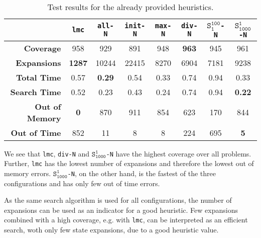 \begin{table}[h!]
    \begin{center}
        \begin{tabular}{|r|c|c|c|c|c|c|c|}
            \hline
            & \textbf{\texttt{lmc}} & \textbf{\texttt{all-N}} & \textbf{\texttt{init-N}} & \textbf{\texttt{max-N}} & \textbf{\texttt{div-N}} & \textbf{$\texttt{S}_\texttt{1}^\texttt{100}$\texttt{-N}} & \textbf{$\texttt{S}_\texttt{1000}^\texttt{1}$\texttt{-N}} \\
            \hline \hline
            \textbf{Coverage}       & 958           & 929           & 891   & 948   & \textbf{963}  & 945   & 961   \\ \hline
            \textbf{Expansions}     & \textbf{1287} & 10244         & 22415 & 8270  & 6904          & 7181  & 9238  \\ \hline
            \textbf{Total Time}     & 0.57          & \textbf{0.29} & 0.54  & 0.33  & 0.74          & 0.94  & 0.33  \\ \hline
            \textbf{Search Time}    & 0.52          & 0.23          & 0.43  & 0.24  & 0.74          & 0.94  & \textbf{0.22}  \\ \hline
            \textbf{Out of Memory}  & \textbf{0}    & 870           & 911   & 854   & 623           & 170   & 844   \\ \hline
            \textbf{Out of Time}    & 852           & 11            & 8     & 8     & 224           & 695   & \textbf{5}     \\ \hline
        \end{tabular}
        \caption{Test results for the already provided heuristics.}
        \label{table:standard_heuristics}
    \end{center}
\end{table}

We see that \texttt{lmc}, \texttt{div-N} and $\texttt{S}_\texttt{1000}^\texttt{1}$\texttt{-N} have the highest coverage over all problems.
Further, \texttt{lmc} has the lowest number of expansions and therefore the lowest out of memory errors.
$\texttt{S}_\texttt{1000}^\texttt{1}$\texttt{-N}, on the other hand, is the fastest of the three configurations and has only few out of time errors.

As the same search algorithm is used for all configurations, the number of expansions can be used as an indicator for a good heuristic.
Few expansions combined with a high coverage, e.g. with \texttt{lmc}, can be interpreted as an efficient search, woth only few state expansions, due to a good heuristic value.

